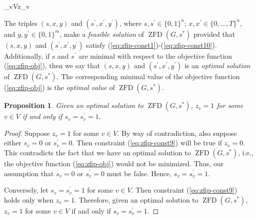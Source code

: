 \documentclass{article}
\newcommand\zfd[1]{\operatorname{ZFD}\left(#1\right)}
\newtheorem{proposition}[theorem]{Proposition}
\theoremstyle{definition}
\begin{document}
\begin{mini!}
	{}{\sum_{v\in V}z_{v}}{}{}\label{eq:zfip-obj}
	\label{eq:zfip-const1}
	\label{eq:zfip-const2}
	\label{eq:zfip-const3}
	\label{eq:zfip-const4}
	\label{eq:zfip-const5}
	\label{eq:zfip-const6}
	\label{eq:zfip-const7}
	\label{eq:zfip-const8}
	\label{eq:zfip-const9}
	\label{eq:zfip-const10}
\end{mini!} 
The triples $(s,x,y)$ and $(s^{'},x^{'},y^{'})$, where $s,s^{'} \in \{0,1\}^{n}$; $x,x^{'} \in \{0,...,T\}^{n}$, and $y,y^{'} \in \{0,1\}^{m}$, make a  \textit{feasible solution} of $\zfd{G,s^{*}}$ provided that $(s,x,y)$ and $(s^{'},x^{'},y^{'})$ satisfy (\ref{eq:zfip-const1})-(\ref{eq:zfip-const10}).
Additionally, if $s$ and $s^{'}$ are minimal with respect to the objective function (\ref{eq:zfip-obj}), then we say that $(s,x,y)$ and $(s^{'},x^{'},y^{'})$ is an \textit{optimal solution} of $\zfd{G,s^{*}}$.
The corresponding minimal value of the objective function (\ref{eq:zfip-obj}) is the \textit{optimal value} of $\zfd{G,s^{*}}$.

\begin{proposition}
Given an optimal solution to $\zfd{G,s^{*}}$, $z_v = 1$ for some $v \in V$ if and only if $s_v = s_v^{'} = 1$.
\end{proposition}

\begin{proof}
Suppose $z_v = 1$ for some $v \in V$.
By way of contradiction, also suppose either $s_v = 0$ or $s_v^{'} = 0$.
Then constraint  (\ref{eq:zfip-const9}) will be true if $z_v = 0$.
This contradicts the fact that we have an optimal solution to $\zfd{G,s^{*}}$, i.e., the objective function (\ref{eq:zfip-obj}) would not be minimized.
Thus, our assumption that $s_v = 0$ or $s_v^{'} = 0$ must be false.
Hence, $s_v = s_v^{'} = 1$.

Conversely, let $s_v = s_v^{'} = 1$ for some $v \in V$.
Then constraint (\ref{eq:zfip-const9}) holds only when $z_v = 1$. 
Therefore, given an optimal solution to $\zfd{G,s^{*}}$, $z_v = 1$ for some $v \in V$ if and only if $s_v = s_v^{'} = 1$.
\end{proof}
\end{document}
